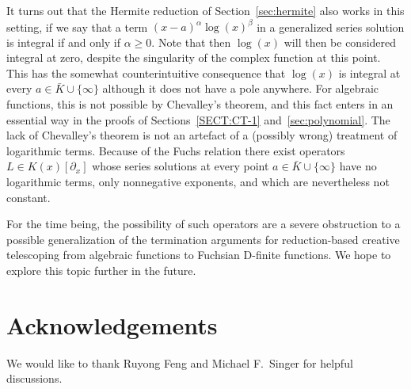 \documentclass{sig-alternate}
\begin{document}
It turns out that the Hermite reduction of Section~\ref{sec:hermite} also works in this setting, if we say that
a term $(x-a)^\alpha\log(x)^\beta$ in a generalized series solution is integral if and only if $\alpha\geq0$.
Note that then $\log(x)$ will then be considered integral at zero, despite the singularity of the complex
function at this point. This has the somewhat counterintuitive consequence that $\log(x)$ is integral at
every $a\in\bar K\cup\{\infty\}$ although it does not have a pole anywhere. For algebraic functions,
this is not possible by Chevalley's theorem, and this fact enters in an essential way in the proofs of
Sections~\ref{SECT:CT-1} and~\ref{sec:polynomial}. The lack of Chevalley's theorem is not an artefact of a (possibly
wrong) treatment of logarithmic terms. Because of the Fuchs relation \cite[p.~241]{schlesinger95} there exist operators
$L\in K(x)[\partial_x]$ whose series solutions at every point $a\in\bar K\cup\{\infty\}$ have no logarithmic
terms, only nonnegative exponents, and which are nevertheless not constant.

For the time being, the possibility of such operators are a severe obstruction to a possible generalization of
the termination arguments for reduction-based creative telescoping from algebraic functions to Fuchsian D-finite
functions. We hope to explore this topic further in the future.

\section*{Acknowledgements}

We would like to thank Ruyong Feng and Michael F.\ Singer for helpful discussions.



\end{document}
